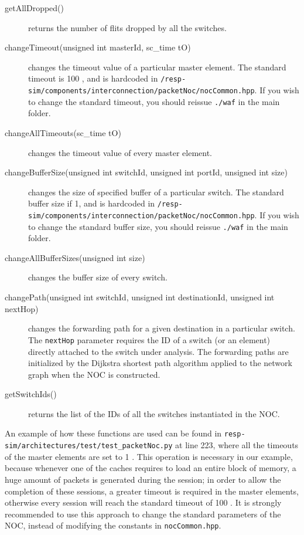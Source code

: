 \documentclass[a4paper,11pt,oneside]{article}
\begin{document}
\begin{description}
\item[getAllDropped()] returns the number of flits dropped by all the switches.
\item[changeTimeout(unsigned int masterId, sc\_time tO)] changes the timeout value of a particular master element. The standard timeout is 100 \nano\second, and is hardcoded in \texttt{/resp-sim/components/interconnection/\linebreak packetNoc/nocCommon.hpp}. If you wish to change the standard timeout, you should reissue \texttt{./waf} in the main folder.
\item[changeAllTimeouts(sc\_time tO)] changes the timeout value of every master element.
\item[changeBufferSize(unsigned int switchId, unsigned int portId, unsigned int size)] changes the size of specified buffer of a particular switch. The standard buffer size if 1, and is hardcoded in \texttt{/resp-sim/components/interconnection/\linebreak packetNoc/nocCommon.hpp}. If you wish to change the standard buffer size, you should reissue \texttt{./waf} in the main folder.
\item[changeAllBufferSizes(unsigned int size)] changes the buffer size of e\-very switch.
\item[changePath(unsigned int switchId, unsigned int destinationId, unsigned int nextHop)] changes the forwarding path for a given destination in a particular switch. The \texttt{nextHop} parameter requires the ID of a switch (or an element) directly attached to the switch under analysis. The forwarding paths are initialized by the Dijkstra shortest path algorithm applied to the network graph when the NOC is constructed.
\item[getSwitchIds()] returns the list of the IDs of all the switches instantiated in the NOC.
\end{description}
An example of how these functions are used can be found in \texttt{resp-sim/\linebreak architectures/test/test\_packetNoc.py} at line 223, where all the timeouts of the master elements are set to 1 \micro\second. This operation is necessary in our example, because whenever one of the caches requires to load an entire block of memory, a huge amount of packets is generated during the session; in order to allow the completion of these sessions, a greater timeout is required in the master elements, otherwise every session will reach the standard timeout of 100 \nano\second. It is strongly recommended to use this approach to change the standard parameters of the NOC, instead of modifying the constants in \texttt{nocCommon.hpp}.
\end{document}
